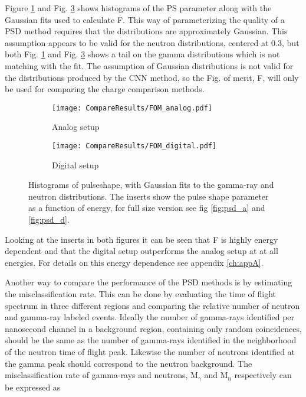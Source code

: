 \documentclass[main.tex]{subfiles}
\begin{document}
Figure \ref{fig:fom_analog} and Fig. \ref{fig:fom_digital} shows histograms of the PS parameter along with the Gaussian fits used to calculate F. This way of parameterizing the quality of a PSD method requires that the distributions are approximately Gaussian. This assumption appears to be valid for the neutron distributions, centered at 0.3, but both Fig. \ref{fig:fom_analog} and Fig. \ref{fig:fom_digital} shows a tail on the gamma distributions which is not matching with the fit. The assumption of Gaussian distributions is not valid for the distributions produced by the CNN method, so the Fig. of merit, F, will only be used for comparing the charge comparison methods. 


\begin{figure}[h]
	\begin{subfigure}[b]{\textwidth}
	    \centering
    	    \texttt{[image: CompareResults/FOM\_analog.pdf]}
        	\caption{Analog setup}
	    \label{fig:fom_analog} 
	\end{subfigure}
	\begin{subfigure}[b]{\textwidth}
    	\centering
        	\texttt{[image: CompareResults/FOM\_digital.pdf]}
        	\caption{Digital setup}
    	\label{fig:fom_digital} 
    \end{subfigure}
    \caption[Histograms of pulseshape, with Gaussian fits.]{Histograms of pulseshape, with Gaussian fits to the gamma-ray and neutron distributions. The inserts show the pulse shape parameter as a function of energy, for full size version see fig \ref{fig:psd_a} and \ref{fig:psd_d}. }
\end{figure}

Looking at the inserts in both figures it can be seen that F is highly energy dependent and that the digital setup outperforms the analog setup at at all energies. For details on this energy dependence see appendix \ref{ch:appA}. 

Another way to compare the performance of the PSD methods is by estimating the misclassification rate. This can be done by evaluating the time of flight spectrum in three different regions and comparing the relative number of neutron and gamma-ray labeled events. Ideally the number of gamma-rays identified per nanosecond channel in a background region, containing only random coincidences, should be the same as the number of gamma-rays identified in the neighborhood of the neutron time of flight peak. Likewise the number of neutrons identified at the gamma peak should correspond to the neutron background. The misclassification rate of gamma-rays and neutrons, 
M$_{\gamma}$ and M$_\textrm{n}$ respectively can be expressed as
\end{document}
